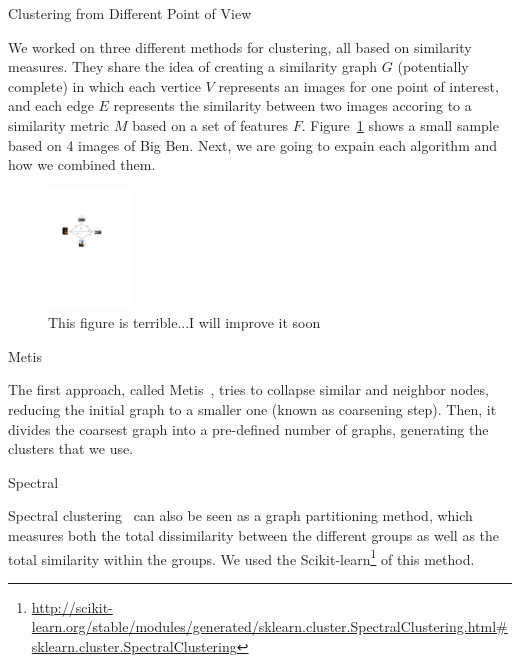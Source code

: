 
\begin{subsection}{Clustering from Different Point of View}

We worked on three different methods for clustering, all based on similarity measures.
They share the idea of creating a similarity graph $G$ (potentially complete) in which each vertice $V$ represents an images for one point of interest, and
each edge $E$ represents the similarity between two images accoring to a similarity metric $M$ based on a set of features $F$.
Figure~\ref{fig:bigben} shows a small sample based on 4 images of Big Ben.
Next, we are going to expain each algorithm and how we combined them.

\begin{figure}[h!]
\centering
\includegraphics[width=0.2\textwidth]{figs/bigben}

\caption{This figure is terrible...I will improve it soon}
\label{fig:bigben}
\end{figure}

\begin{subsubsection}{Metis}

The first approach, called Metis~\cite{metis},
tries to collapse similar and neighbor nodes, reducing the initial graph to a smaller one (known as coarsening step).
Then, it divides the coarsest graph into a pre-defined number of graphs, generating the clusters that we use.  

\end{subsubsection}

\begin{subsubsection}{Spectral}

Spectral clustering~\cite{spectral} can also be seen as a graph partitioning method, which measures both the total dissimilarity between the different groups 
as well as the total similarity within the groups. We used the Scikit-learn\footnote{\url{http://scikit-learn.org/stable/modules/generated/sklearn.cluster.SpectralClustering.html#sklearn.cluster.SpectralClustering}} of this method. 

\end{subsubsection}


\end{subsection}
